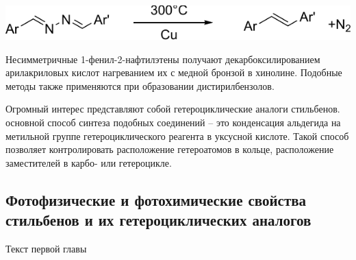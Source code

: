 			\begin{scheme}
				\includegraphics{Dissertation/images/part1/Stylbenes3}	
			\end{scheme}
		
			Несимметричные 1-фенил-2-нафтилэтены получают декарбоксилированием арилакриловых кислот нагреванием их с медной бронзой в хинолине. Подобные методы также применяются при образовании дистирилбензолов.
			
			Огромный интерес представляют собой гетероциклические аналоги стильбенов. \cite{Taek1987, Liang2003, Lipunova2011} основной способ синтеза подобных соединений -- это конденсация альдегида на метильной группе гетероциклического реагента в уксусной кислоте. \cite{Nosova2011, Lipunova2011, Ouyang2009a, Wang2009, Liang2003, Yim2008, Cazaux1993} Такой способ позволяет контролировать расположение гетероатомов в кольце, расположение заместителей в карбо- или гетероцикле. 
		
		
		\subsection{Фотофизические и фотохимические свойства стильбенов и их гетероциклических аналогов}
		
			Текст первой главы
			
			\begin{scheme}
			\end{scheme}
			
			
			
			
			